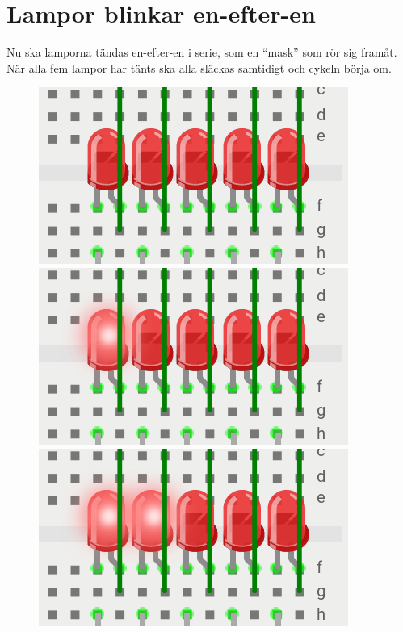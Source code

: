 \documentclass[11pt]{article}
\begin{document}
\section{Lampor blinkar en-efter-en}\label{sec:sekvensiell-blinkning}
Nu ska lamporna tändas en-efter-en i serie, som en ``mask'' som rör sig framåt.
När alla fem lampor har tänts ska alla släckas samtidigt och cykeln börja om.
\begin{figure}[H]
      \centering
      \begin{minipage}{0.3\textwidth}
            \includegraphics[width=\textwidth]{2-0}
      \end{minipage}
      \begin{minipage}{0.3\textwidth}
            \includegraphics[width=\textwidth]{2-1}
      \end{minipage}
      \begin{minipage}{0.3\textwidth}
            \includegraphics[width=\textwidth]{2-2}
      \end{minipage}
\end{figure}
\end{document}
